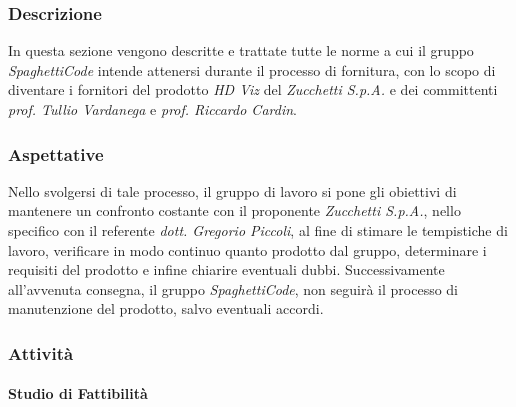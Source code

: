 \subsubsection{Descrizione}

In questa sezione vengono descritte e trattate tutte le norme a cui il gruppo \emph{SpaghettiCode} intende attenersi 
durante il processo di fornitura, con lo scopo di diventare i fornitori del prodotto \emph{HD Viz} del 
 \emph{Zucchetti S.p.A.} e dei committenti \emph{prof. Tullio Vardanega} e 
\emph{prof. Riccardo Cardin}.

\subsubsection{Aspettative}

Nello svolgersi di tale processo, il gruppo di lavoro si pone gli obiettivi di mantenere un confronto costante con il 
proponente \emph{Zucchetti S.p.A.}, nello specifico con il referente \emph{dott. Gregorio Piccoli}, al fine di stimare 
le tempistiche di lavoro, verificare in modo continuo quanto prodotto dal gruppo, determinare i requisiti del prodotto 
e infine chiarire eventuali dubbi.
Successivamente all'avvenuta consegna, il gruppo \emph{SpaghettiCode}, non seguirà il processo di manutenzione del 
prodotto, salvo eventuali accordi.

\subsubsection{Attività}

\paragraph{Studio di Fattibilità}
\label{par:studio_fattibilita}


